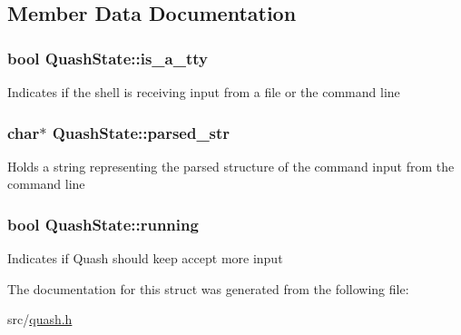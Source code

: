 \subsection{Member Data Documentation}
\hypertarget{structQuashState_a6d92242ecd91c33779ea2deae58956bf}{
\subsubsection[{is\-\_\-a\-\_\-tty}]{\setlength{\rightskip}{0pt plus 5cm}bool Quash\-State\-::is\-\_\-a\-\_\-tty}}\label{structQuashState_a6d92242ecd91c33779ea2deae58956bf}
Indicates if the shell is receiving input from a file or the command line \hypertarget{structQuashState_a69d0ad3cb3bf44a92459020d98814f7e}{
\subsubsection[{parsed\-\_\-str}]{\setlength{\rightskip}{0pt plus 5cm}char$\ast$ Quash\-State\-::parsed\-\_\-str}}\label{structQuashState_a69d0ad3cb3bf44a92459020d98814f7e}
Holds a string representing the parsed structure of the command input from the command line \hypertarget{structQuashState_a7db3a718696ee9d0c7f8b649ccb88bb4}{
\subsubsection[{running}]{\setlength{\rightskip}{0pt plus 5cm}bool Quash\-State\-::running}}\label{structQuashState_a7db3a718696ee9d0c7f8b649ccb88bb4}
Indicates if Quash should keep accept more input 

The documentation for this struct was generated from the following file\-:\begin{DoxyCompactItemize}
\item 
src/\hyperlink{quash_8h}{quash.\-h}\end{DoxyCompactItemize}
